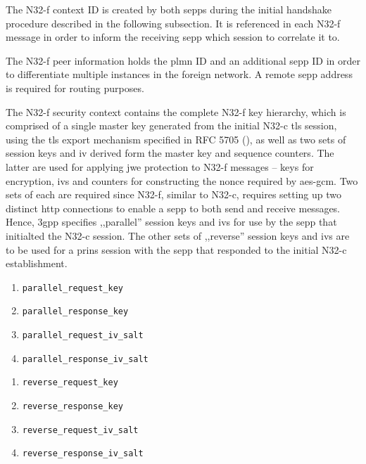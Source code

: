 The N32-f context ID is created by both \glspl{sepp} during the initial handshake procedure described in the following subsection.
It is referenced in each N32-f message in order to inform the receiving \gls{sepp} which session to correlate it to.

The N32-f peer information holds the \gls{plmn} ID and an additional \gls{sepp} ID in order to differentiate multiple instances in the foreign network.
A remote \gls{sepp} address is required for routing purposes.

The N32-f security context contains the complete N32-f key hierarchy, which is comprised of a single master key generated from the initial N32-c \gls{tls} session, using the \gls{tls} export mechanism specified in RFC 5705 (\cite{rfc5705}), as well as two sets of session keys and \gls{iv} derived form the master key and sequence counters.
The latter are used for applying \gls{jwe} protection to N32-f messages -- keys for encryption, \glspl{iv} and counters for constructing the nonce required by \gls{aes}-\gls{gcm}.
Two sets of each are required since N32-f, similar to N32-c, requires setting up two distinct \gls{http} connections to enable a \gls{sepp} to both send and receive messages.
Hence, \gls{3gpp} specifies ,,parallel'' session keys and \glspl{iv} for use by the \gls{sepp} that initialted the N32-c session.
The other sets of ,,reverse'' session keys and \glspl{iv} are to be used for a \gls{prins} session with the \gls{sepp} that responded to the initial N32-c establishment.

\begin{minipage}[l]{0.5\textwidth}
    \begin{enumerate}[label=--]
        \item \texttt{parallel\_request\_key}
        \item \texttt{parallel\_response\_key}
        \item \texttt{parallel\_request\_iv\_salt}
        \item \texttt{parallel\_response\_iv\_salt}
    \end{enumerate}
\end{minipage}%
\begin{minipage}[r]{0.5\textwidth}
    \begin{enumerate}[label=--]
        \item \texttt{reverse\_request\_key}
        \item \texttt{reverse\_response\_key}
        \item \texttt{reverse\_request\_iv\_salt}
        \item \texttt{reverse\_response\_iv\_salt}
    \end{enumerate}
\end{minipage}\\

